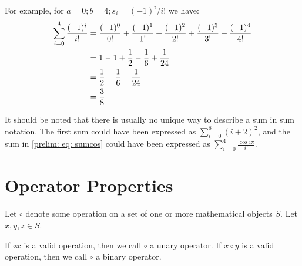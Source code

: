 \documentclass[../proofs.tex]{subfiles}
\begin{document}
  For example, for $a = 0; b = 4; s_i = (-1)^i/i!$ we have:
  \begin{align}
    \sum_{i=0}^{4}{\frac{(-1)^i}{i!}} &= \frac{ (-1)^{0} }{ 0! } + \frac{ (-1)^{1} }{ 1! } + \frac{ (-1)^{2} }{ 2! }
                                      + \frac{ (-1)^{3} }{ 3! } + \frac{ (-1)^{4} }{ 4! }  \label{prelim: eq: sumcos} \\
                                      &= 1 - 1 + \frac{1}{2} - \frac{1}{6} + \frac{1}{24} \\
                                      &= \frac{1}{2} - \frac{1}{6} + \frac{1}{24} \\
                                      &= \frac{3}{8}
  \end{align}

  It should be noted that there is usually no unique way to describe a sum in
  sum notation. The first sum could have been expressed as
  $\sum_{i=0}^{8}{(i+2)^2}$, and the sum in \ref{prelim: eq: sumcos} could have
  been expressed as $\sum_{i=0}^{4}{ \frac{\cos{i\pi}} {i!} }.$

  \section{Operator Properties}
  \newcommand{\op}{\circ}
  Let $\op$ denote some operation on a set of one or more mathematical
  objects $S$. Let $x, y, z \in S$.

  If $\op x$ is a valid operation, then we call $\op$ a unary operator. If
  $x \op y$ is a valid operation, then we call $\op$ a binary operator.



\end{document}
